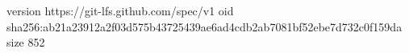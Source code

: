 version https://git-lfs.github.com/spec/v1
oid sha256:ab21a23912a2f03d575b43725439ae6ad4cdb2ab7081bf52ebe7d732c0f159da
size 852
